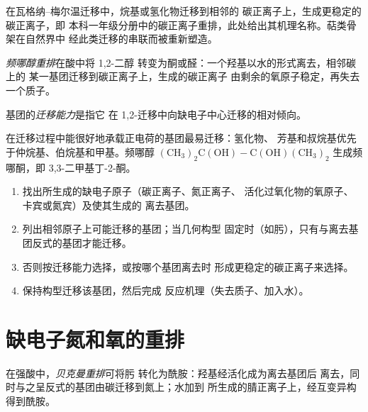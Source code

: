 在瓦格纳–梅尔温迁移中，烷基或氢化物迁移到相邻的
碳正离子上，生成更稳定的碳正离子，即
本科一年级分册中的碳正离子重排，此处给出其机理名称。萜类骨架在自然界中
经此类迁移的串联而被重新塑造。

\begin{definition}[频哪醇重排]\label{def:b3:radicals-carbenes:pinacol}
\emph{频哪醇重排}在酸中将 1,2-二醇
转变为酮或醛：一个羟基以水的形式离去，相邻碳上的
某一基团迁移到碳正离子上，生成的碳正离子
由剩余的氧原子稳定，再失去一个质子。
\end{definition}

\begin{definition}[迁移能力]\label{def:b3:radicals-carbenes:migratory}
基团的\emph{迁移能力}是指它
在 1,2-迁移中向缺电子中心迁移的相对倾向。
\end{definition}

在迁移过程中能很好地承载正电荷的基团最易迁移：氢化物、
芳基和叔烷基优先于仲烷基、伯烷基和甲基。频哪醇
$\mathrm{(CH_3)_2C(OH){-}C(OH)(CH_3)_2}$ 生成频哪酮，即 3,3-二甲基丁-2-酮。

\begin{method}[预测重排产物]\label{met:b3:radicals-carbenes:rearrangement}
\begin{enumerate}
  \item 找出所生成的缺电子原子（碳正离子、氮正离子、
        活化过氧化物的氧原子、卡宾或氮宾）及使其生成的
        离去基团。
  \item 列出相邻原子上可能迁移的基团；当几何构型
        固定时（如肟），只有与离去基团反式的基团才能迁移。
  \item 否则按迁移能力选择，或按哪个基团离去时
        形成更稳定的碳正离子来选择。
  \item 保持构型迁移该基团，然后完成
        反应机理（失去质子、加入水）。
\end{enumerate}
\end{method}

\section{缺电子氮和氧的重排}

\begin{definition}[贝克曼重排]\label{def:b3:radicals-carbenes:beckmann}
在强酸中，\emph{贝克曼重排}可将肟
转化为酰胺：羟基经活化成为离去基团后
离去，同时与之呈反式的基团由碳迁移到氮上；水加到
所生成的腈正离子上，经互变异构得到酰胺。
\end{definition}

